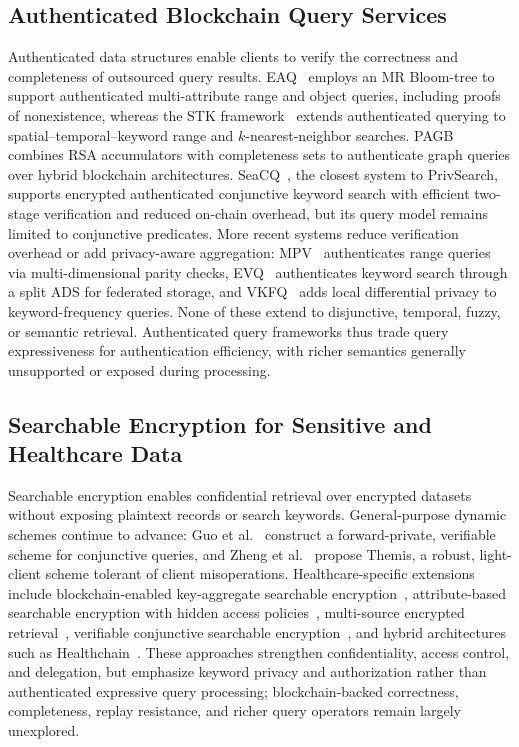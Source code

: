 \subsection{Authenticated Blockchain Query Services}
\label{2B}

Authenticated data structures enable clients to verify the correctness and completeness of outsourced query results. EAQ~\cite{Yin} employs an MR Bloom-tree to support authenticated multi-attribute range and object queries, including proofs of nonexistence, whereas the STK framework~\cite{Xu} extends authenticated querying to spatial--temporal--keyword range and $k$-nearest-neighbor searches. PAGB~\cite{Wu} combines RSA accumulators with completeness sets to authenticate graph queries over hybrid blockchain architectures. SeaCQ~\cite{Yang}, the closest system to PrivSearch, supports encrypted authenticated conjunctive keyword search with efficient two-stage verification and reduced on-chain overhead, but its query model remains limited to conjunctive predicates. More recent systems reduce verification overhead or add privacy-aware aggregation: MPV~\cite{Liu} authenticates range queries via multi-dimensional parity checks, EVQ~\cite{ChenBaochao} authenticates keyword search through a split ADS for federated storage, and VKFQ~\cite{Ji} adds local differential privacy to keyword-frequency queries. None of these extend to disjunctive, temporal, fuzzy, or semantic retrieval. Authenticated query frameworks thus trade query expressiveness for authentication efficiency, with richer semantics generally unsupported or exposed during processing.

\subsection{Searchable Encryption for Sensitive and Healthcare Data}
\label{2C}

Searchable encryption enables confidential retrieval over encrypted datasets without exposing plaintext records or search keywords. General-purpose dynamic schemes continue to advance: Guo et al.~\cite{Guo} construct a forward-private, verifiable scheme for conjunctive queries, and Zheng et al.~\cite{Zheng} propose Themis, a robust, light-client scheme tolerant of client misoperations. Healthcare-specific extensions include blockchain-enabled key-aggregate searchable encryption~\cite{LeeJoonYoung}, attribute-based searchable encryption with hidden access policies~\cite{Zhang}, multi-source encrypted retrieval~\cite{Yao}, verifiable conjunctive searchable encryption~\cite{Lu}, and hybrid architectures such as Healthchain~\cite{Li}. These approaches strengthen confidentiality, access control, and delegation, but emphasize keyword privacy and authorization rather than authenticated expressive query processing; blockchain-backed correctness, completeness, replay resistance, and richer query operators remain largely unexplored.

